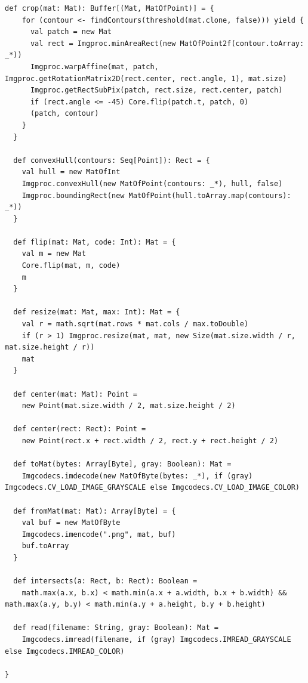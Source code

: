\documentclass{jsarticle}
\begin{document}
\begin{lstlisting}[caption=package.scala,label=package]
  def crop(mat: Mat): Buffer[(Mat, MatOfPoint)] = {
    for (contour <- findContours(threshold(mat.clone, false))) yield {
      val patch = new Mat
      val rect = Imgproc.minAreaRect(new MatOfPoint2f(contour.toArray: _*))
      Imgproc.warpAffine(mat, patch, Imgproc.getRotationMatrix2D(rect.center, rect.angle, 1), mat.size)
      Imgproc.getRectSubPix(patch, rect.size, rect.center, patch)
      if (rect.angle <= -45) Core.flip(patch.t, patch, 0)
      (patch, contour)
    }
  }

  def convexHull(contours: Seq[Point]): Rect = {
    val hull = new MatOfInt
    Imgproc.convexHull(new MatOfPoint(contours: _*), hull, false)
    Imgproc.boundingRect(new MatOfPoint(hull.toArray.map(contours): _*))
  }

  def flip(mat: Mat, code: Int): Mat = {
    val m = new Mat
    Core.flip(mat, m, code)
    m
  }

  def resize(mat: Mat, max: Int): Mat = {
    val r = math.sqrt(mat.rows * mat.cols / max.toDouble)
    if (r > 1) Imgproc.resize(mat, mat, new Size(mat.size.width / r, mat.size.height / r))
    mat
  }

  def center(mat: Mat): Point =
    new Point(mat.size.width / 2, mat.size.height / 2)

  def center(rect: Rect): Point =
    new Point(rect.x + rect.width / 2, rect.y + rect.height / 2)

  def toMat(bytes: Array[Byte], gray: Boolean): Mat =
    Imgcodecs.imdecode(new MatOfByte(bytes: _*), if (gray) Imgcodecs.CV_LOAD_IMAGE_GRAYSCALE else Imgcodecs.CV_LOAD_IMAGE_COLOR)

  def fromMat(mat: Mat): Array[Byte] = {
    val buf = new MatOfByte
    Imgcodecs.imencode(".png", mat, buf)
    buf.toArray
  }

  def intersects(a: Rect, b: Rect): Boolean =
    math.max(a.x, b.x) < math.min(a.x + a.width, b.x + b.width) && math.max(a.y, b.y) < math.min(a.y + a.height, b.y + b.height)

  def read(filename: String, gray: Boolean): Mat =
    Imgcodecs.imread(filename, if (gray) Imgcodecs.IMREAD_GRAYSCALE else Imgcodecs.IMREAD_COLOR)

}
\end{lstlisting}
\end{document}
